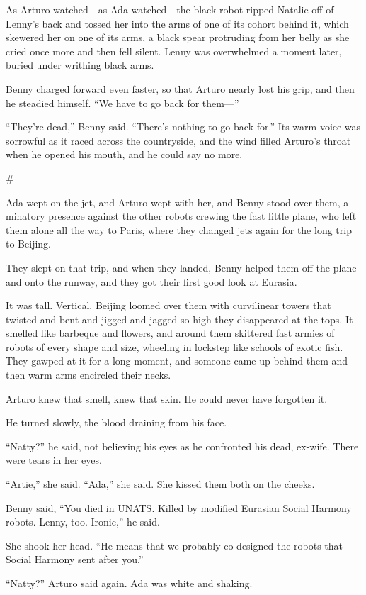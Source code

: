 As Arturo watched—as Ada watched—the black robot ripped Natalie off
of Lenny’s back and tossed her into the arms of one of its cohort
behind it, which skewered her on one of its arms, a black spear
protruding from her belly as she cried once more and then fell
silent. Lenny was overwhelmed a moment later, buried under writhing
black arms.

Benny charged forward even faster, so that Arturo nearly lost his
grip, and then he steadied himself. “We have to go back for them—”

“They’re dead,” Benny said. “There’s nothing to go back for.” Its
warm voice was sorrowful as it raced across the countryside, and
the wind filled Arturo’s throat when he opened his mouth, and he
could say no more.

\#

Ada wept on the jet, and Arturo wept with her, and Benny stood over
them, a minatory presence against the other robots crewing the fast
little plane, who left them alone all the way to Paris, where they
changed jets again for the long trip to Beijing.

They slept on that trip, and when they landed, Benny helped them
off the plane and onto the runway, and they got their first good
look at Eurasia.

It was tall. Vertical. Beijing loomed over them with curvilinear
towers that twisted and bent and jigged and jagged so high they
disappeared at the tops. It smelled like barbeque and flowers, and
around them skittered fast armies of robots of every shape and
size, wheeling in lockstep like schools of exotic fish. They gawped
at it for a long moment, and someone came up behind them and then
warm arms encircled their necks.

Arturo knew that smell, knew that skin. He could never have
forgotten it.

He turned slowly, the blood draining from his face.

“Natty?” he said, not believing his eyes as he confronted his dead,
ex-wife. There were tears in her eyes.

“Artie,” she said. “Ada,” she said. She kissed them both on the
cheeks.

Benny said, “You died in UNATS. Killed by modified Eurasian Social
Harmony robots. Lenny, too. Ironic,” he said.

She shook her head. “He means that we probably co-designed the
robots that Social Harmony sent after you.”

“Natty?” Arturo said again. Ada was white and shaking.

